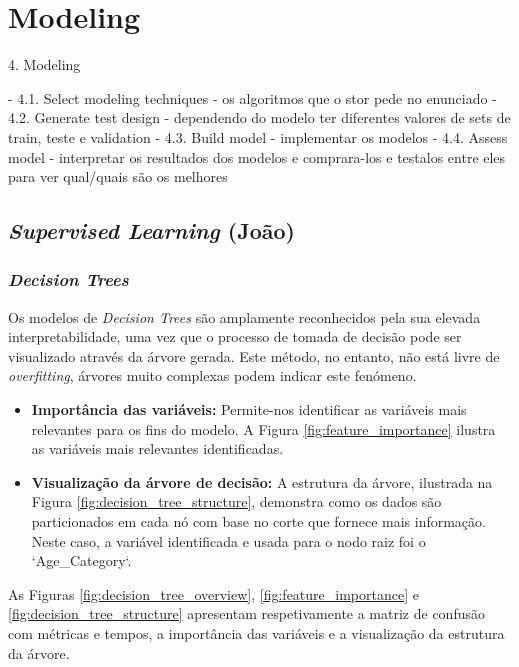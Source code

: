 \chapter{Modeling}
\label{chap4:modeling}

4. Modeling

- 4.1. Select modeling techniques - os algoritmos que o stor pede no enunciado
- 4.2. Generate test design - dependendo do modelo ter diferentes valores de sets de train, teste e validation
- 4.3. Build model - implementar os modelos
- 4.4. Assess model - interpretar os resultados dos modelos e comprara-los e testalos entre eles para ver qual/quais são os melhores

\section{\textit{Supervised Learning} (João)}
\label{chap4:super}

\subsection{\textit{Decision Trees}}
\label{chap4:decision_tree}

Os modelos de \textit{Decision Trees} são amplamente reconhecidos pela sua elevada interpretabilidade, uma vez que o processo de tomada de decisão pode ser visualizado através da árvore gerada. Este método, no entanto, não está livre de \textit{overfitting}, árvores muito complexas podem indicar este fenómeno.

\begin{itemize}
    \item \textbf{Importância das variáveis:} Permite-nos identificar as variáveis mais relevantes para os fins do modelo. A Figura \ref{fig:feature_importance} ilustra as variáveis mais relevantes identificadas.
    \item \textbf{Visualização da árvore de decisão:} A estrutura da árvore, ilustrada na Figura \ref{fig:decision_tree_structure}, demonstra como os dados são particionados em cada nó com base no corte que fornece mais informação. Neste caso, a variável identificada e usada para o nodo raiz foi o `Age\_Category`. 
\end{itemize}

As Figuras \ref{fig:decision_tree_overview}, \ref{fig:feature_importance} e \ref{fig:decision_tree_structure} apresentam respetivamente a matriz de confusão com métricas e tempos, a importância das variáveis e a visualização da estrutura da árvore.


